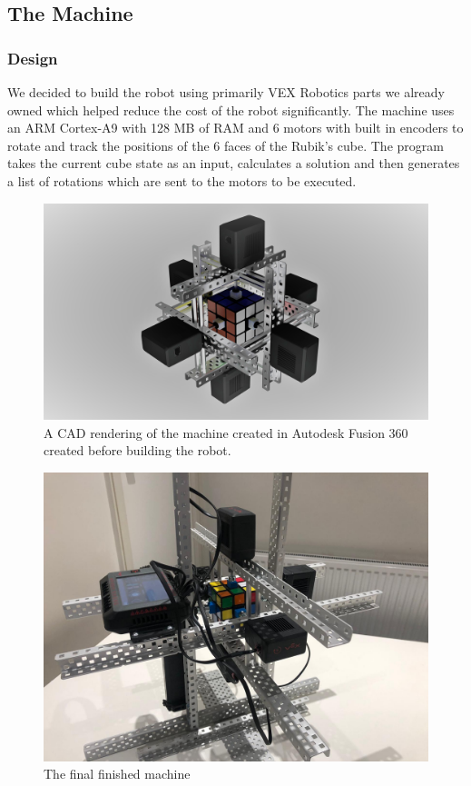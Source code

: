 \documentclass[8pt]{article}
\begin{document}
\subsection{The Machine}

\subsubsection{Design}

We decided to build the robot using primarily VEX Robotics parts we already owned which helped
reduce the cost of the robot significantly. The machine uses an ARM Cortex-A9 with
128 MB of RAM and 6 motors with built in encoders to rotate and track the
positions of the 6 faces of the Rubik's cube. The program takes the current cube state
as an input, calculates a solution and then generates a list of rotations which are sent
to the motors to be executed.


\begin{minipage}{0.45\textwidth}
\begin{figure}[H]
\centering
\includegraphics[scale=0.05]{main cad.jpg}
\caption{A CAD rendering of the machine created in Autodesk Fusion 360 created
before building the robot.}
\end{figure}
\end{minipage}%
\hfill
\begin{minipage}{0.45\textwidth}
\begin{figure}[H]
\centering
\includegraphics[scale=0.11]{final machine.jpg}
\caption{The final finished machine}
\end{figure}
\end{minipage}
\end{document}
